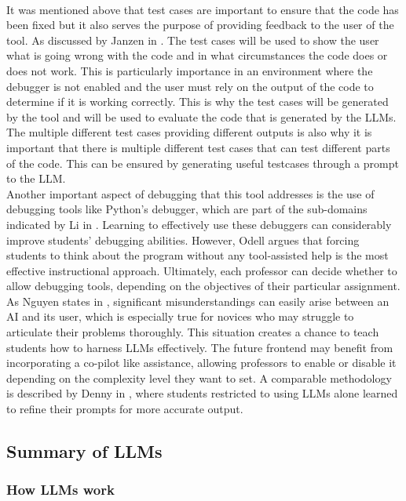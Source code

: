 \documentclass[12pt]{extarticle}
\begin{document}
\\
It was mentioned above that test cases are important to ensure that the code has been fixed but it also serves the purpose of providing feedback to the user of the tool. As discussed by Janzen in \cite{Janzen2008}. The test cases will be used to show the user what is going wrong with the code and in what circumstances the code does or does not work. This is particularly importance in an environment where the debugger is not enabled and the user must rely on the output of the code to determine if it is working correctly. This is why the test cases will be generated by the tool and will be used to evaluate the code that is generated by the LLMs. The multiple different test cases providing different outputs is also why it is important that there is multiple different test cases that can test different parts of the code. This can be ensured by generating useful testcases through a prompt to the LLM.
\\
Another important aspect of debugging that this tool addresses is the use of debugging tools like Python’s debugger, which are part of the sub-domains indicated by Li in \cite{li2019}. Learning to effectively use these debuggers can considerably improve students’ debugging abilities. However, Odell \cite{odell2017} argues that forcing students to think about the program without any tool-assisted help is the most effective instructional approach. Ultimately, each professor can decide whether to allow debugging tools, depending on the objectives of their particular assignment.
\\
As Nguyen states in \cite{nguyen2024}, significant misunderstandings can easily arise between an AI and its user, which is especially true for novices who may struggle to articulate their problems thoroughly. This situation creates a chance to teach students how to harness LLMs effectively. The future frontend may benefit from incorporating a co-pilot like assistance, allowing professors to enable or disable it depending on the complexity level they want to set. A comparable methodology is described by Denny in \cite{denny2023}, where students restricted to using LLMs alone learned to refine their prompts for more accurate output.

\subsection{Summary of LLMs}
\subsubsection{How LLMs work}
\end{document}
